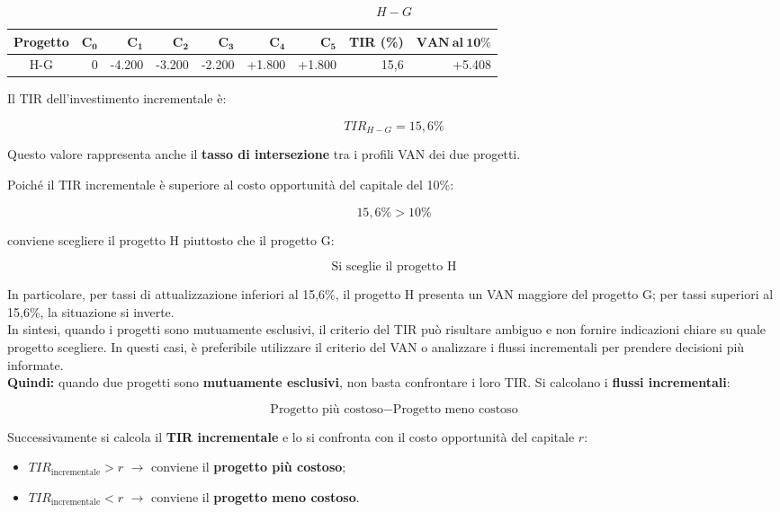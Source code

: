 \[
H-G
\]

\begin{center}
\begin{tabular}{c|rrrrrr|r|r}
\textbf{Progetto} &
$\mathbf{C_0}$ & $\mathbf{C_1}$ & $\mathbf{C_2}$ &
$\mathbf{C_3}$ & $\mathbf{C_4}$ & $\mathbf{C_5}$ &
\textbf{TIR (\%)} & $\mathbf{VAN\ al\ 10\%}$ \\
\hline
H-G & 0 & -4.200 & -3.200 & -2.200 & +1.800 & +1.800
& 15,6 & +5.408
\end{tabular}
\end{center}

\noindent Il TIR dell'investimento incrementale è:

\[
\boxed{TIR_{H-G}=15,6\%}
\]

\noindent Questo valore rappresenta anche il \textbf{tasso di intersezione}
tra i profili VAN dei due progetti.

\noindent Poiché il TIR incrementale è superiore al costo opportunità
del capitale del 10\%:

\[
15,6\% > 10\%
\]

\noindent conviene scegliere il progetto H piuttosto che il progetto G:

\[
\boxed{\text{Si sceglie il progetto H}}
\]

\noindent In particolare, per tassi di attualizzazione inferiori al 15,6\%,
il progetto H presenta un VAN maggiore del progetto G; per tassi superiori
al 15,6\%, la situazione si inverte.\\

\noindent In sintesi, quando i progetti sono mutuamente esclusivi, 
il criterio del TIR può risultare ambiguo e non fornire indicazioni chiare su quale progetto scegliere. In questi casi, è preferibile utilizzare il 
criterio del VAN o analizzare i flussi incrementali per prendere decisioni più informate.\\
\textbf{Quindi:} quando due progetti sono \textbf{mutuamente esclusivi}, non basta confrontare i loro TIR. Si calcolano i \textbf{flussi incrementali}:

\[
\text{Progetto più costoso} - \text{Progetto meno costoso}
\]

\noindent Successivamente si calcola il \textbf{TIR incrementale} e lo si confronta con il costo opportunità del capitale $r$:

\begin{itemize}
    \item $TIR_{\text{incrementale}} > r$ $\rightarrow$ conviene il \textbf{progetto più costoso};
    \item $TIR_{\text{incrementale}} < r$ $\rightarrow$ conviene il \textbf{progetto meno costoso}.
\end{itemize}

